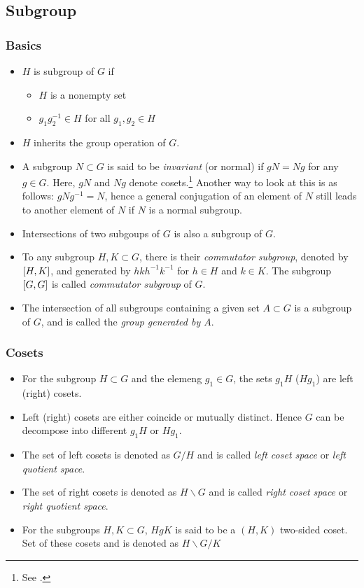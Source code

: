 \subsection{Subgroup}
\subsubsection{Basics}
\begin{itemize}
	\item $H$ is subgroup of $G$ if
	\begin{itemize}
		\item $H$ is a nonempty set
		\item $g_1g_2^{-1}\in H$ for all $g_1,g_2 \in H$
	\end{itemize}
	\item $H$ inherits the group operation of $G$.
	\item A subgroup $N\subset G$ is said to be \emph{invariant} (or normal) if $gN=Ng$ for any $g\in G$. Here, $gN$ and $Ng$ denote cosets.\footnote{See \secref{\ref{sec:cosets}}.} Another way to look at this is as follows: $gNg^{-1}=N$, hence a general conjugation of an element of $N$ still leads to another element of $N$ if $N$ is a normal subgroup.
	\item Intersections of two subgoups of $G$ is also a subgroup of $G$.
	\item To any subgroup $H,K\subset G$, there is their \emph{commutator subgroup}, denoted by $\comm{H}{K}$, and generated by $hkh^{-1}k^{-1}$ for $h\in H$ and $k\in K$. The subgroup $\comm{G}{G}$ is called \emph{commutator subgroup} of $G$.
	\item The intersection of all subgroups containing a given set $A\subset G$ is a subgroup of $G$, and is called the \emph{group generated by $A$}.
\end{itemize}
\subsubsection{Cosets}
\label{sec:cosets}
\begin{itemize}
	\item For the subgroup $H\subset G$ and the elemeng $g_1\in G$, the sets $g_1 H$ ($Hg_1$) are left (right) cosets.
	\item Left (right) cosets are either coincide or mutually distinct. Hence $G$ can be decompose into different $g_1H$ or $Hg_1$.
	\item The set of left cosets is denoted as $G/H$ and is called \emph{left coset space} or \emph{left quotient space}.
	\item The set of right cosets is denoted as $H\backslash G$ and is called \emph{right coset space} or \emph{right quotient space}.
	\item For the subgroups $H,K\subset G$, $HgK$ is said to be a $(H,K)$ two-sided coset. Set of these cosets and is denoted as $H\backslash G/K$
\end{itemize}
